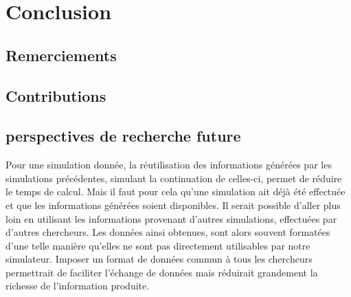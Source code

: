 \documentclass[journal, a4paper]{IEEEtran}
\begin{document}
\section{Conclusion}\label{sec:conclusion}

	\subsection*{Remerciements}
	\subsection*{Contributions}
	\subsection*{perspectives de recherche future}
	Pour une simulation donnée, la réutilisation des informations générées
	par les simulations précédentes, simulant la continuation de celles-ci,
	permet	de réduire	le temps	de calcul.
	Mais il faut pour cela qu'une simulation ait déjà été effectuée
	et que les informations générées soient disponibles.
	Il serait possible d'aller plus loin en
	utilisant les
	informations provenant d'autres simulations, effectuées par d'autres
	chercheurs.
	Les données ainsi obtenues, sont alors souvent formatées d'une
	telle manière qu'elles ne sont pas directement utilisables par
	notre simulateur.
	Imposer un format de données commun à tous les chercheurs permettrait
	de faciliter l'échange de données mais réduirait grandement la
	richesse de l'information produite.
\end{document}
